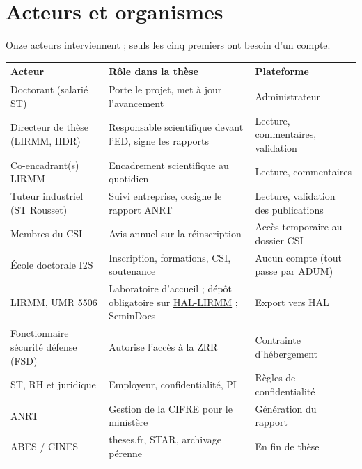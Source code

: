 \documentclass[11pt,a4paper]{article}
\begin{document}
\section{Acteurs et organismes}

Onze acteurs interviennent ; seuls les cinq premiers ont besoin d'un compte.

\begin{center}\small
\begin{tabularx}{\linewidth}{P{3.8cm} L P{3.6cm}}
\toprule
\textbf{Acteur} & \textbf{Rôle dans la thèse} & \textbf{Plateforme}\\
\midrule
Doctorant (salarié ST) & Porte le projet, met à jour l'avancement & Administrateur\\
Directeur de thèse (LIRMM, HDR) & Responsable scientifique devant l'ED, signe les rapports & Lecture, commentaires, validation\\
Co-encadrant(s) LIRMM & Encadrement scientifique au quotidien & Lecture, commentaires\\
Tuteur industriel (ST Rousset) & Suivi entreprise, cosigne le rapport ANRT & Lecture, validation des publications\\
Membres du CSI & Avis annuel sur la réinscription & Accès temporaire au dossier CSI\\
École doctorale I2S & Inscription, formations, CSI, soutenance & Aucun compte (tout passe par \href{https://www.adum.fr}{ADUM})\\
LIRMM, UMR 5506 & Laboratoire d'accueil ; dépôt obligatoire sur \href{https://www.lirmm.fr/?p=1097}{HAL-LIRMM} ; SeminDocs & Export vers HAL\\
Fonctionnaire sécurité défense (FSD) & Autorise l'accès à la ZRR & Contrainte d'hébergement\\
ST, RH et juridique & Employeur, confidentialité, PI & Règles de confidentialité\\
ANRT & Gestion de la CIFRE pour le ministère & Génération du rapport\\
ABES / CINES & theses.fr, STAR, archivage pérenne & En fin de thèse\\
\bottomrule
\end{tabularx}
\end{center}
\end{document}
